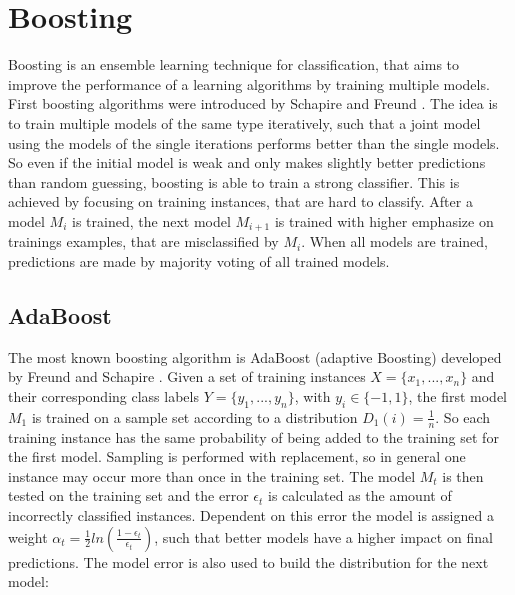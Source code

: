 \documentclass[10pt]{reportMaster}
\begin{document}





\section{Boosting}
\label{sec:boosting}
Boosting is an ensemble learning technique for classification, that aims to improve the performance of a learning algorithms by training multiple models.
First boosting algorithms were introduced by Schapire \cite{boostingSchapire} and Freund \cite{boostingFreund}.
The idea is to train multiple models of the same type iteratively, such that a joint model using the models of the single iterations performs better than the single models.
So even if the initial model is weak and only makes slightly better predictions than random guessing, boosting is able to train a strong classifier.
This is achieved by focusing on training instances, that are hard to classify.
After a model $M_i$ is trained, the next model $M_{i+1}$ is trained with higher emphasize on trainings examples, that are misclassified by $M_i$. 
When all models are trained, predictions are made by majority voting of all trained models.

\subsection*{AdaBoost}
\label{sec:adaBoost}
The most known boosting algorithm is AdaBoost (adaptive Boosting) developed by Freund and Schapire \cite{boostingIntro}.
Given a set of training instances $X = \{x_1, ..., x_n\}$ and their corresponding class labels $Y = \{y_1, ..., y_n\}$, with $y_i \in \{-1, 1\}$, the first model $M_1$ is trained on a sample set according to a distribution $D_1(i) = \frac{1}{n}$. So each training instance has the same probability of being added to the training set for the first model.
Sampling is performed with replacement, so in general one instance may occur more than once in the training set.
The model $M_t$ is then tested on the training set and the error $\epsilon_t$ is calculated as the amount of incorrectly classified instances.
Dependent on this error the model is assigned a weight $\alpha_t = \frac{1}{2} ln(\frac{1 - \epsilon_t}{\epsilon_t})$, such that better models have a higher impact on final predictions.
The model error is also used to build the distribution for the next model: 
\end{document}
